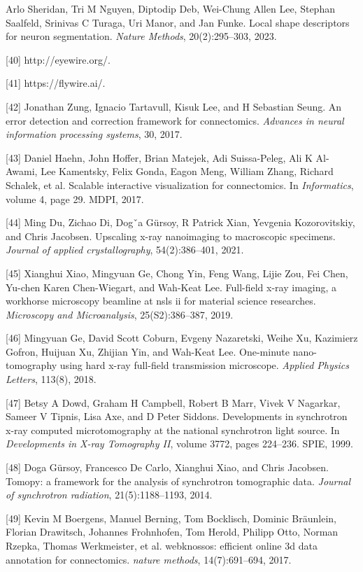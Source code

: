 \documentclass{article}
\begin{document}
\begin{hangpars}
[39] Arlo Sheridan, Tri M Nguyen, Diptodip Deb, Wei-Chung Allen Lee, Stephan Saalfeld, Srinivas C Turaga, Uri Manor, and Jan Funke. Local shape descriptors for neuron segmentation. \emph{Nature Methods}, 20(2):295–303, 2023.

[40] http://eyewire.org/.

[41] https://flywire.ai/.

[42] Jonathan Zung, Ignacio Tartavull, Kisuk Lee, and H Sebastian Seung. An error detection and correction framework for connectomics. \emph{Advances in neural information processing systems}, 30, 2017.

[43] Daniel Haehn, John Hoffer, Brian Matejek, Adi Suissa-Peleg, Ali K Al-Awami, Lee Kamentsky, Felix Gonda, Eagon Meng, William Zhang, Richard Schalek, et al. Scalable interactive visualization for connectomics. In \emph{Informatics}, volume 4, page 29. MDPI, 2017.

[44] Ming Du, Zichao Di, Dogˇa Gürsoy, R Patrick Xian, Yevgenia Kozorovitskiy, and Chris Jacobsen. Upscaling x-ray nanoimaging to macroscopic specimens. \emph{Journal of applied crystallography}, 54(2):386–401, 2021.

[45] Xianghui Xiao, Mingyuan Ge, Chong Yin, Feng Wang, Lijie Zou, Fei Chen, Yu-chen Karen Chen-Wiegart, and Wah-Keat Lee. Full-field x-ray imaging, a workhorse microscopy beamline at nsls ii for material science researches. \emph{Microscopy and Microanalysis}, 25(S2):386–387, 2019.

[46] Mingyuan Ge, David Scott Coburn, Evgeny Nazaretski, Weihe Xu, Kazimierz Gofron, Huijuan Xu, Zhijian Yin, and Wah-Keat Lee. One-minute nano-tomography using hard x-ray full-field transmission microscope. \emph{Applied Physics Letters}, 113(8), 2018.

[47] Betsy A Dowd, Graham H Campbell, Robert B Marr, Vivek V Nagarkar, Sameer V Tipnis, Lisa Axe, and D Peter Siddons. Developments in synchrotron x-ray computed microtomography at the national synchrotron light source. In \emph{Developments in X-ray Tomography II}, volume 3772, pages 224–236. SPIE, 1999.

[48] Doga Gürsoy, Francesco De Carlo, Xianghui Xiao, and Chris Jacobsen. Tomopy: a framework for the analysis of synchrotron tomographic data. \emph{Journal of synchrotron radiation}, 21(5):1188–1193, 2014.

[49] Kevin M Boergens, Manuel Berning, Tom Bocklisch, Dominic Bräunlein, Florian Drawitsch, Johannes Frohnhofen, Tom Herold, Philipp Otto, Norman Rzepka, Thomas Werkmeister, et al. webknossos: efficient online 3d data annotation for connectomics. \emph{nature methods}, 14(7):691–694, 2017.


\end{hangpars}
\end{document}
